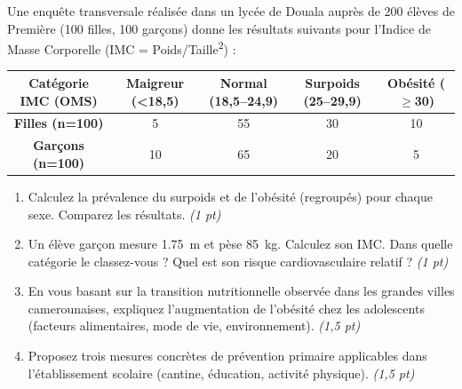 \documentclass[11pt]{article}
\begin{document}
\begin{exercice}
Une enquête transversale réalisée dans un lycée de Douala auprès de 200 élèves de Première (100 filles, 100 garçons) donne les résultats suivants pour l'Indice de Masse Corporelle (IMC = Poids/Taille\textsuperscript{2}) :

\begin{tabular}{|c|c|c|c|c|}
\hline
\textbf{Catégorie IMC (OMS)} & \textbf{Maigreur (<18,5)} & \textbf{Normal (18,5--24,9)} & \textbf{Surpoids (25--29,9)} & \textbf{Obésité ($\ge$30)} \\
\hline
\textbf{Filles (n=100)} & 5 & 55 & 30 & 10 \\
\hline
\textbf{Garçons (n=100)} & 10 & 65 & 20 & 5 \\
\hline
\end{tabular}

\begin{enumerate}
    \item Calculez la prévalence du surpoids et de l'obésité (regroupés) pour chaque sexe. Comparez les résultats. \textit{(1 pt)}
    \item Un élève garçon mesure \SI{1,75}{\meter} et pèse \SI{85}{\kilo\gram}. Calculez son IMC. Dans quelle catégorie le classez-vous ? Quel est son risque cardiovasculaire relatif ? \textit{(1 pt)}
    \item En vous basant sur la transition nutritionnelle observée dans les grandes villes camerounaises, expliquez l'augmentation de l'obésité chez les adolescents (facteurs alimentaires, mode de vie, environnement). \textit{(1,5 pt)}
    \item Proposez trois mesures concrètes de prévention primaire applicables dans l'établissement scolaire (cantine, éducation, activité physique). \textit{(1,5 pt)}
\end{enumerate}
\end{exercice}
\end{document}
